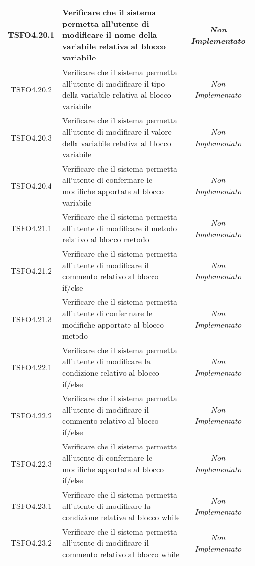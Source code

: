 \begin{longtable}{|c|>{}m{8cm}|c|}
\hypertarget{TSFO4.20.1}{TSFO4.20.1} & Verificare che il sistema permetta all'utente di modificare il nome della variabile relativa al blocco variabile & \textit{Non Implementato}\\ \hline
\hypertarget{TSFO4.20.2}{TSFO4.20.2} & Verificare che il sistema permetta all'utente di modificare il tipo della variabile relativa al blocco variabile & \textit{Non Implementato}\\ \hline
\hypertarget{TSFO4.20.3}{TSFO4.20.3} & Verificare che il sistema permetta all'utente di modificare il valore della variabile relativa al blocco variabile & \textit{Non Implementato}\\ \hline
\hypertarget{TSFO4.20.4}{TSFO4.20.4} & Verificare che il sistema permetta all'utente di confermare le modifiche apportate al blocco variabile & \textit{Non Implementato}\\ \hline
\hypertarget{TSFO4.21.1}{TSFO4.21.1} & Verificare che il sistema permetta all'utente di modificare il metodo relativo al blocco metodo & \textit{Non Implementato}\\ \hline
\hypertarget{TSFO4.21.2}{TSFO4.21.2} & Verificare che il sistema permetta all'utente di modificare il commento relativo al blocco if/else & \textit{Non Implementato}\\ \hline
\hypertarget{TSFO4.21.3}{TSFO4.21.3} & Verificare che il sistema permetta all'utente di confermare le modifiche apportate al blocco metodo & \textit{Non Implementato}\\ \hline
\hypertarget{TSFO4.22.1}{TSFO4.22.1} & Verificare che il sistema permetta all'utente di modificare la condizione relativo al blocco if/else & \textit{Non Implementato}\\ \hline
\hypertarget{TSFO4.22.2}{TSFO4.22.2} & Verificare che il sistema permetta all'utente di modificare il commento relativo al blocco if/else & \textit{Non Implementato}\\ \hline
\hypertarget{TSFO4.22.3}{TSFO4.22.3} & Verificare che il sistema permetta all'utente di confermare le modifiche apportate al blocco if/else & \textit{Non Implementato}\\ \hline
\hypertarget{TSFO4.23.1}{TSFO4.23.1} & Verificare che il sistema permetta all'utente di modificare la condizione relativa al blocco while & \textit{Non Implementato}\\ \hline
\hypertarget{TSFO4.23.2}{TSFO4.23.2} & Verificare che il sistema permetta all'utente di modificare il commento relativo al blocco while & \textit{Non Implementato}\\ \hline

\end{longtable}
